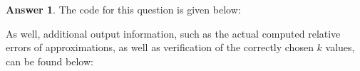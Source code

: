 \documentclass{article}
\theoremstyle{definition}
\newtheorem*{answer}{Answer}
\begin{document}
\begin{enumerate}[leftmargin=\labelsep]
\begin{enumerate}
\begin{answer}
			            The code for this question is given below:
			            \begin{mdframed}[backgroundcolor=lightgray]
			            \end{mdframed}

			            As well, additional output information, such as the actual computed relative errors of approximations, as well as verification of the correctly chosen \(k\) values, can be found below:
			            \begin{mdframed}[backgroundcolor=lightgray]
				            \inputminted{text}{out/prob8-output.txt}
			            \end{mdframed}
		            \end{answer}
	      \end{enumerate}
\end{enumerate}
\end{document}
